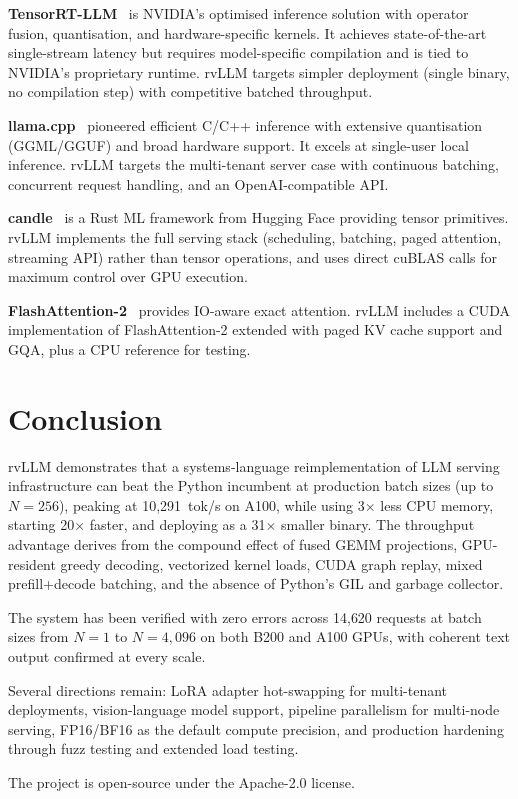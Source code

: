 \textbf{TensorRT-LLM}~\cite{tensorrtllm2024} is NVIDIA's optimised inference
solution with operator fusion, quantisation, and hardware-specific kernels. It
achieves state-of-the-art single-stream latency but requires model-specific
compilation and is tied to NVIDIA's proprietary runtime. rvLLM targets simpler
deployment (single binary, no compilation step) with competitive batched throughput.

\textbf{llama.cpp}~\cite{llamacpp2023} pioneered efficient C/C++ inference with
extensive quantisation (GGML/GGUF) and broad hardware support. It excels at
single-user local inference. rvLLM targets the multi-tenant server case with
continuous batching, concurrent request handling, and an OpenAI-compatible API.

\textbf{candle}~\cite{candle2023} is a Rust ML framework from Hugging Face
providing tensor primitives. rvLLM implements the full serving stack
(scheduling, batching, paged attention, streaming API) rather than tensor operations,
and uses direct cuBLAS calls for maximum control over GPU execution.

\textbf{FlashAttention-2}~\cite{dao2023flashattention2} provides IO-aware exact
attention. rvLLM includes a CUDA implementation of FlashAttention-2 extended with
paged KV cache support and GQA, plus a CPU reference for testing.

\section{Conclusion}
\label{sec:conclusion}

rvLLM demonstrates that a systems-language reimplementation of LLM serving
infrastructure can beat the Python incumbent at production batch sizes (up to
$N\!=\!256$), peaking at 10{,}291~tok/s on A100, while using 3$\times$ less CPU
memory, starting 20$\times$ faster, and deploying as a 31$\times$ smaller binary.
The throughput advantage derives from the compound effect of fused GEMM projections,
GPU-resident greedy decoding, vectorized kernel loads, CUDA graph replay,
mixed prefill+decode batching, and the absence of Python's GIL and garbage collector.

The system has been verified with zero errors across 14{,}620 requests at batch
sizes from $N\!=\!1$ to $N\!=\!4{,}096$ on both B200 and A100 GPUs, with coherent
text output confirmed at every scale.

Several directions remain: LoRA adapter hot-swapping for multi-tenant deployments,
vision-language model support, pipeline parallelism for multi-node serving, FP16/BF16
as the default compute precision, and production hardening through fuzz testing and
extended load testing.

The project is open-source under the Apache-2.0 license.





